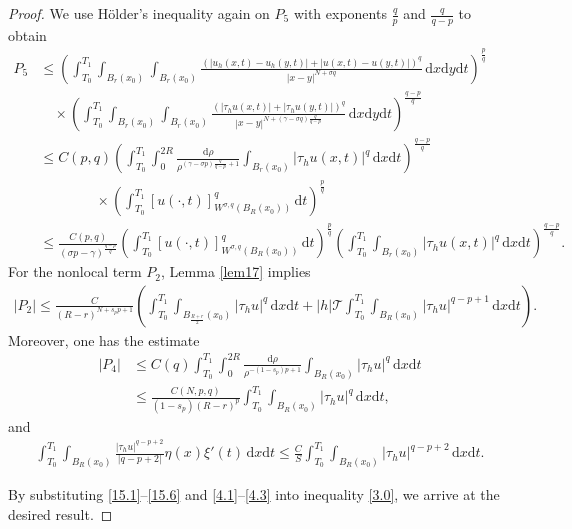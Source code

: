 \documentclass[reqno,10pt]{amsart}
\numberwithin{equation}{section}
\begin{document}
\begin{proof}
	We use H\"{o}lder's inequality again on $P_5$ with exponents $\frac{q}{p}$ and $\frac{q}{q-p}$ to obtain
	\begin{align}
		\label{15.3}
		P_5&\le\left( \int_{T_0}^{T_1}\int_{B_r(x_0)}\int_{B_r(x_0)}\frac{\left( |u_h(x,t)-u_h(y,t)|+|u(x,t)-u(y,t)|\right)^q}{|x-y|^{N+\sigma q}}\,\mathrm{d}x\mathrm{d}y\mathrm{d}t\right)^{\frac{p}{q}}\nonumber\\
		&\quad\times\left( \int_{T_0}^{T_1}\int_{B_r(x_0)}\int_{B_r(x_0)}\frac{\left( |\tau_hu(x,t)|+|\tau_hu(y,t)|\right)^{q}}{|x-y|^{N+(\gamma-\sigma q)\frac{q}{q-p}}}\,\mathrm{d}x\mathrm{d}y\mathrm{d}t\right)^\frac{q-p}{q}\nonumber\\
		&\le C(p,q)\left( \int_{T_0}^{T_1}\int_0^{2R}\frac{\mathrm{d}\rho}{\rho^{(\gamma-\sigma p)\frac{q}{q-p}+1}}\int_{B_r(x_0)}|\tau_hu(x,t)|^q\,\mathrm{d}x\mathrm{d}t\right)^\frac{q-p}{q}\nonumber\\
		&\qquad\qquad\times\left( \int_{T_0}^{T_1}[u(\cdot,t)]^q_{W^{\sigma,q}(B_R(x_0))}\,\mathrm{d}t\right)^{\frac{p}{q}}\nonumber\\
		&\le \frac{C(p,q)}{(\sigma p-\gamma)^\frac{q-p}{q}}\left( \int_{T_0}^{T_1}[u(\cdot,t)]^q_{W^{\sigma,q}(B_R(x_0))}\,\mathrm{d}t\right)^{\frac{p}{q}}\left(\int_{T_0}^{T_1}\int_{B_r(x_0)}|\tau_hu(x,t)|^q\,\mathrm{d}x\mathrm{d}t \right)^\frac{q-p}{q}.
	\end{align}
	For the nonlocal term $P_2$, Lemma \ref{lem17} implies
	\begin{align}
		\label{15.4}
		|P_2|\le \frac{C}{(R-r)^{N+s_pp+1}}\left( \int_{T_0}^{T_1}\int_{B_\frac{R+r}{2}(x_0)}|\tau_hu|^q\,\mathrm{d}x\mathrm{d}t+|h|\mathcal{T}\int_{T_0}^{T_1}\int_{B_R(x_0)}|\tau_hu|^{q-p+1}\,\mathrm{d}x\mathrm{d}t\right).
	\end{align}
	Moreover, one has the estimate
	\begin{align}
		\label{15.5}
		|P_4|&\le C(q)\int_{T_0}^{T_1}\int_{0}^{2R}\frac{\mathrm{d}\rho}{\rho^{-(1-s_p)p+1}}\int_{B_R(x_0)}|\tau_hu|^q\,\mathrm{d}x\mathrm{d}t\nonumber\\
		&\le \frac{C(N,p,q)}{(1-s_p)(R-r)^p}\int_{T_0}^{T_1}\int_{B_R(x_0)}|\tau_hu|^q\,\mathrm{d}x\mathrm{d}t,
	\end{align}
	and
	\begin{align}
		\label{15.6}
		\int_{T_0}^{T_1}\int_{B_R(x_0)}\frac{|\tau_hu|^{q-p+2}}{|q-p+2|}\eta(x)\xi'(t)\,\mathrm{d}x\mathrm{d}t\le\frac{C}{S}\int_{T_0}^{T_1}\int_{B_R(x_0)}|\tau_hu|^{q-p+2}\,\mathrm{d}x\mathrm{d}t.
	\end{align}
	
By substituting \eqref{15.1}–\eqref{15.6} and \eqref{4.1}–\eqref{4.3} into inequality \eqref{3.0}, we arrive at the desired result.
\end{proof}
\end{document}
